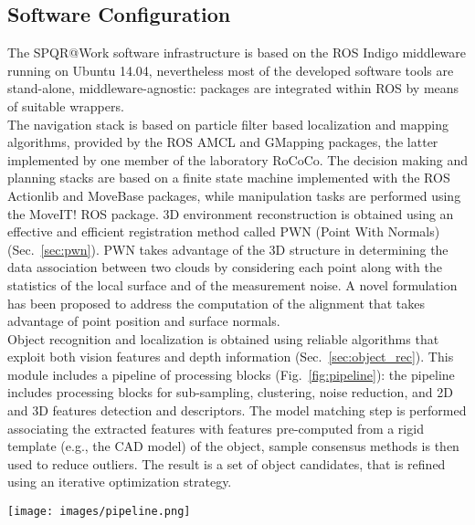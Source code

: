 \documentclass[conference]{IEEEtran}
\begin{document}
\subsection{Software Configuration}

The SPQR@Work software infrastructure is based on the ROS Indigo middleware running on Ubuntu 14.04, nevertheless most of the developed software tools are stand-alone, middleware-agnostic: packages are integrated within ROS by means of suitable wrappers.\\
The navigation stack is based on particle filter based localization and mapping algorithms, provided by the ROS AMCL and GMapping packages, the latter implemented by one member of the laboratory RoCoCo. The decision making and planning stacks are based on a finite state machine implemented with the ROS Actionlib and MoveBase packages, while manipulation tasks are performed using the MoveIT! ROS package.
3D environment reconstruction is obtained using an effective and efficient registration method called PWN (Point With Normals) (Sec.~\ref{sec:pwn}). 
PWN takes advantage of the 3D structure in determining the data association between two clouds by considering each point along with the statistics of the local surface and of the measurement noise. A novel formulation has been proposed to address the computation of the alignment that takes advantage of point position and surface normals.\\

Object recognition and localization is obtained using reliable algorithms that exploit both vision features and depth information (Sec.~\ref{sec:object_rec}). This module includes a pipeline of processing blocks (Fig.~\ref{fig:pipeline}): the pipeline includes processing blocks for sub-sampling, clustering, noise reduction, and 2D and 3D features detection and descriptors. The model matching step is performed associating the extracted features with features pre-computed from a rigid template (e.g., the CAD model) of the object, sample consensus methods is then used to reduce outliers. The result is a set of object candidates, that is refined using an iterative optimization strategy. 

\begin{figure*}[t!]
\begin{center}
\texttt{[image: images/pipeline.png]}
\end{center}
\caption{The SPQR@Work object recognition and localization pipeline.}\label{fig:pipeline}
\end{figure*}
\end{document}

